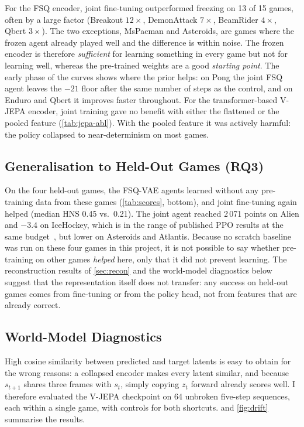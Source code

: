 \documentclass[runningheads]{llncs}
\begin{document}
For the FSQ encoder, joint fine-tuning outperformed freezing on 13 of 15 games, often by a
large factor (Breakout $12\times$, DemonAttack $7\times$, BeamRider $4\times$, Qbert $3\times$).
The two exceptions, MsPacman and Asteroids, are games where the frozen agent already
played well and the difference is within noise. The frozen encoder is therefore
\emph{sufficient} for learning something in every game but not for learning well, whereas
the pre-trained weights are a good \emph{starting point}. The early phase of the
curves shows where the prior helps: on Pong the joint FSQ agent leaves the $-21$ floor
after the same number of steps as the control, and on Enduro and Qbert it improves faster
throughout. For the transformer-based V-JEPA encoder, joint training gave no benefit with
either the flattened or the pooled feature (\cref{tab:jepa-abl}). With the pooled feature
it was actively harmful: the policy collapsed to near-determinism on most games.

\subsection{Generalisation to Held-Out Games (RQ3)}
\label{sec:heldout}

On the four held-out games, the FSQ-VAE agents learned without any pre-training data from
these games (\cref{tab:scores}, bottom), and joint fine-tuning again helped (median HNS
0.45 vs.\ 0.21). The joint agent reached 2\,071 points on Alien and $-3.4$ on IceHockey,
which is in the range of published PPO results at the same budget~\cite{schulman2017ppo},
but lower on Asteroids and Atlantis. Because no scratch baseline was run on these four
games in this project, it is not possible to say whether pre-training on other games
\emph{helped} here, only that it did not prevent learning. The reconstruction results of
\cref{sec:recon} and the world-model diagnostics below suggest that the representation
itself does not transfer: any success on held-out games comes from fine-tuning or from the
policy head, not from features that are already correct.

\subsection{World-Model Diagnostics}
\label{sec:jepa-diag}

High cosine similarity between predicted and target latents is easy to obtain for the
wrong reasons: a collapsed encoder makes every latent similar, and because $s_{t+1}$ shares
three frames with $s_t$, simply copying $z_t$ forward already scores well. I therefore
evaluated the V-JEPA checkpoint on 64 unbroken five-step sequences, each within a single
game, with controls for both shortcuts.  and \cref{fig:drift} summarise the
results.
\end{document}
